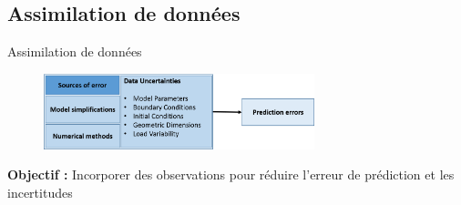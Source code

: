 \documentclass[aspectratio=169]{beamer} %
\begin{document}
\subsection{Assimilation de données}
\begin{frame}{Assimilation de données}
    \begin{figure}
        \centering
        \includegraphics[width=0.7\textwidth]{../../conference/images/source_of_uncertainties.png}
    \end{figure}

    \textbf{Objectif :} Incorporer des observations pour réduire l'erreur de prédiction et les incertitudes
    \begin{figure}
        \centering
    \end{figure}
    \vfill
\end{frame}
\end{document}
